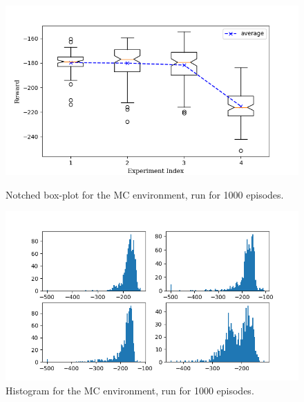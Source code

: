 \documentclass[hidelinks,journal]{IEEEtran}
\begin{document}
\begin{appendices}
\begin{figure}[!h]
  \centering
  \includegraphics[scale=1]{graph/mcEvalBox.png}
  \caption{Notched box-plot for the MC environment, run for 1000 episodes.}
  \includegraphics[scale=1]{graph/mcEvalHist.png}
  \caption{Histogram for the MC environment, run for 1000 episodes.}
\end{figure}

\pagebreak

\end{appendices}
\end{document}
